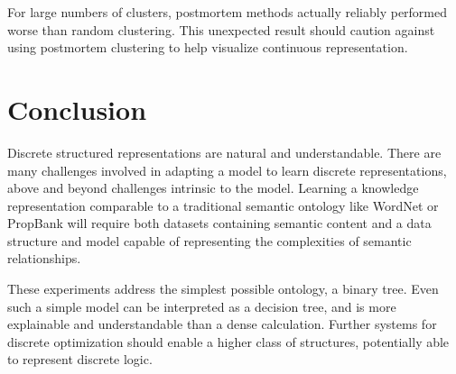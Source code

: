 \documentclass[11pt,letterpaper]{article}
\begin{document}
For large numbers of clusters, postmortem methods actually reliably performed worse than random clustering. This unexpected result should caution against using postmortem clustering to help visualize continuous representation.

\section{Conclusion}
Discrete structured representations are natural and understandable. There are many challenges involved in adapting a model to learn discrete representations, above and beyond challenges intrinsic to the model. Learning a knowledge representation comparable to a traditional semantic ontology like WordNet or PropBank will require both datasets containing semantic content and a data structure and model capable of representing the complexities of semantic relationships.

These experiments address the simplest possible ontology, a binary tree. Even such a simple model can be interpreted as a decision tree, and is more explainable and understandable than a dense calculation. Further systems for discrete optimization should enable a higher class of structures, potentially able to represent discrete logic.



\end{document}
